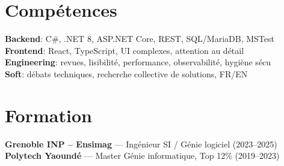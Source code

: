 \documentclass[10pt,a4paper]{article}
\begin{document}
\section{Comp\'etences}
\textbf{Backend}: C\#, .NET 8, ASP.NET Core, REST, SQL/MariaDB, MSTest\\
\textbf{Frontend}: React, TypeScript, UI complexes, attention au d\'etail\\
\textbf{Engineering}: revues, lisibilit\'e, performance, observabilit\'e, hygi\`ene s\'ecu\\
\textbf{Soft}: d\'ebats techniques, recherche collective de solutions, FR/EN

\section{Formation}
\textbf{Grenoble INP -- Ensimag} --- Ing\'enieur SI / G\'enie logiciel (2023--2025)\\
\textbf{Polytech Yaound\'e} --- Master G\'enie informatique, Top 12\% (2019--2023)
\end{document}
